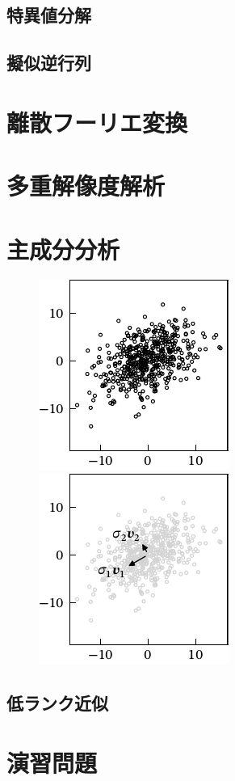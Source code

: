 \documentclass[../../main]{subfiles}
\begin{document}
\subsection{特異値分解}
\subsection{擬似逆行列}

\section{離散フーリエ変換}

\section{多重解像度解析}

\section{主成分分析}
\begin{figure}[htbp]
  \begin{minipage}{\linewidth/2}
    \centering
    \includegraphics{scatter.pdf}
  \end{minipage}%
  \begin{minipage}{\linewidth/2}
    \centering
    \includegraphics{pca.pdf}
  \end{minipage}
\end{figure}

\begin{subappendices}
\section{低ランク近似}
\end{subappendices}

\section*{演習問題}
\end{document}
